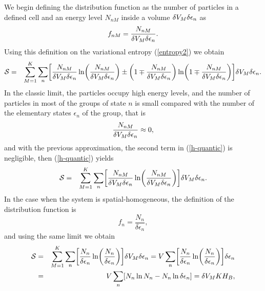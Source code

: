 We begin defining the distribution function as the number of particles in a defined cell and an energy level $N_{nM}$ inside a volume $\delta V_M \delta \epsilon_n$ as
\begin{equation}
    f_{nM}=\frac{N_{nM}}{ \delta V_M \delta \epsilon_{n} }.
\end{equation}
Using this definition on the variational entropy (\ref{entropy2}) we obtain
\begin{eqnarray}
    \Ss&=& \sum_{M=1}^{K} \sum_n
    \left[  
           \frac{N_{nM}}{ \de V_M\delta \epsilon_{n}} \ln 
           \left( 
                  \frac{N_{nM}}{ \de V_M\delta \epsilon_{n}}
           \right)\pm 
           \left(  
                  1\mp \frac{N_{nM}}{ \de V_M \delta \epsilon_{n}}
           \right) \ln 
           \left(  
                   1\mp \frac{N_{nM}}{ \de V_M \delta \epsilon_{n}}
           \right)
    \right] \de V_M \delta \epsilon_{n}. \nonumber \\
    \label{h-quantic} 
\end{eqnarray}
In the classic limit, the particles occupy high energy levels, and the number of particles in most of the groups of state $n$ is small compared with the number of the elementary states $\epsilon_n$ of the group, that is
\begin{equation}
    \frac{N_{nM}}{ \delta V_M \delta \epsilon_{n} } \approx 0,
\end{equation}
and with the previous approximation, the second term in (\ref{h-quantic}) is negligible, then (\ref{h-quantic}) yields
\begin{eqnarray}
    \Ss&=& \sum_{M=1}^{K} \sum_n
    \left[  
           \frac{N_{nM}}{ \de V_M \delta \epsilon_{n}} \ln 
           \left( 
                  \frac{N_{nM}}{ \de V_M \delta \epsilon_{n}}
           \right)
    \right] \de V_M \delta \epsilon_{n}. \label{h-quantic2}
\end{eqnarray}
In the case when the system is spatial-homogeneous, the definition of the distribution function is 
\begin{equation}
    f_{n}=\frac{N_{n}}{ \delta \epsilon_{n} },
\end{equation}
and using the same limit we obtain
\begin{eqnarray}
    \Ss&=& \sum_{M=1}^{K} \sum_n
    \left[  
           \frac{N_{n}}{ \delta \epsilon_{n}} \ln 
           \left( 
                  \frac{N_{n}}{ \delta \epsilon_{n}}
           \right)
    \right]  \de V_M \delta \epsilon_{n} = V \sum_n
    \left[  
           \frac{N_{n}}{ \delta \epsilon_{n}} \ln 
           \left( 
                  \frac{N_{n}}{ \delta \epsilon_{n}}
           \right)
    \right] \delta \epsilon_{n} \nonumber \\
    &=& V \sum_n \left[N_n \ln N_n - N_n \ln \delta \epsilon_n  \right]=\de V_M K H_{B},\label{h-quantic4}
\end{eqnarray}

